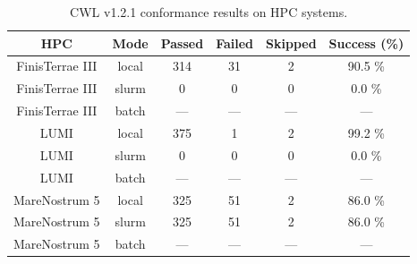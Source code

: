 \documentclass{article}
\begin{document}
\begin{table}[ht!]
\centering
\setlength{\tabcolsep}{6pt}
\renewcommand{\arraystretch}{1.2}
\begin{tabular}{|c|c|c|c|c|c|}
\hline
\rowcolor{lightgray!50}
\textbf{HPC} & \textbf{Mode} & \textbf{Passed} & \textbf{Failed} & \textbf{Skipped} & \textbf{Success (\%)} \\
\hline
FinisTerrae III & local & 314 & 31 & 2 & 90.5 \% \\
FinisTerrae III & slurm & 0 & 0 & 0 & 0.0 \% \\
FinisTerrae III & batch & — & — & — & — \\
\hline\hline
LUMI & local & 375 & 1 & 2 & 99.2 \% \\
LUMI & slurm & 0 & 0 & 0 & 0.0 \% \\
LUMI & batch & — & — & — & — \\
\hline\hline
MareNostrum 5 & local & 325 & 51 & 2 & 86.0 \% \\
MareNostrum 5 & slurm & 325 & 51 & 2 & 86.0 \% \\
MareNostrum 5 & batch & — & — & — & — \\
\hline
\end{tabular}
\caption{CWL v1.2.1 conformance results on HPC systems.}
\label{tab:streamflow_v12}
\end{table}
\end{document}
